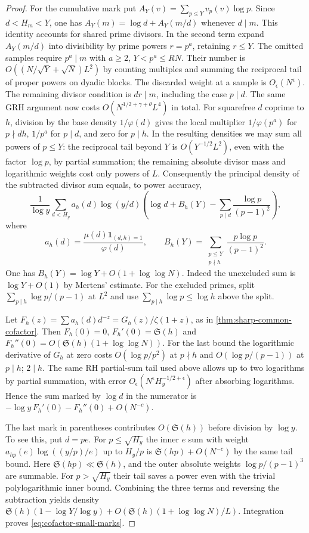 \documentclass[11pt,a4paper]{article}
\numberwithin{equation}{section}
\newcommand{\SSS}{\mathfrak S}
\begin{document}
\begin{proof}
For the cumulative mark put $A_Y(v)=\sum_{p\le Y}v_p(v)\log p$.
Since $d<H_m<Y$, one has $A_Y(m)=\log d+A_Y(m/d)$ whenever
$d\mid m$. This identity accounts for shared prime divisors.
In the second term expand $A_Y(m/d)$ into divisibility by prime
powers $r=p^a$, retaining $r\le Y$. The omitted samples require
$p^a\mid m$ with $a\ge2$, $Y<p^a\le RN$. Their number is
$O((N/\sqrt Y+\sqrt N)L^2)$ by counting multiples and summing
the reciprocal tail of proper powers on dyadic blocks. The
discarded weight at a sample is $O_\epsilon(N^\epsilon)$.
The remaining divisor condition is $dr\mid m$, including the
case $p\mid d$. The same GRH argument now costs
$O(N^{1/2+\gamma+\theta}L^4)$ in total. For squarefree $d$
coprime to $h$, division by the base density $1/\varphi(d)$
gives the local multiplier $1/\varphi(p^a)$ for $p\nmid dh$,
$1/p^a$ for $p\mid d$, and zero for $p\mid h$.
In the resulting densities we may sum all powers of $p\le Y$:
the reciprocal tail beyond $Y$ is $O(Y^{-1/2}L^2)$, even with
the factor $\log p$, by partial summation; the remaining absolute
divisor mass and logarithmic weights cost only powers of $L$.
Consequently the principal density of the subtracted divisor
sum equals, to power accuracy,
\[
 \frac1{\log y}\sum_{d<H_y}a_h(d)\log(y/d)
 \left(\log d+B_h(Y)-\sum_{p\mid d}\frac{\log p}{(p-1)^2}\right),
\]
where
\[
 a_h(d)=\frac{\mu(d)\mathbf1_{(d,h)=1}}{\varphi(d)},\qquad
 B_h(Y)=\sum_{\substack{p\le Y\\p\nmid h}}\frac{p\log p}{(p-1)^2}.
\]
One has $B_h(Y)=\log Y+O(1+\log\log N)$. Indeed the unexcluded
sum is $\log Y+O(1)$ by Mertens' estimate. For the excluded
primes, split $\sum_{p\mid h}\log p/(p-1)$ at $L^2$ and use
$\sum_{p\mid h}\log p\le\log h$ above the split.

Let $F_h(z)=\sum a_h(d)d^{-z}=G_h(z)/\zeta(1+z)$, as in
\cref{thm:sharp-common-cofactor}. Then $F_h(0)=0$,
$F_h'(0)=\SSS(h)$ and
$F_h''(0)=O(\SSS(h)(1+\log\log N))$. For the last bound the
logarithmic derivative of $G_h$ at zero costs
$O(\log p/p^2)$ at $p\nmid h$ and $O(\log p/(p-1))$ at
$p\mid h$; $2\mid h$. The same RH partial-sum tail used above
allows up to two logarithms by partial summation, with error
$O_\epsilon(N^\epsilon H_y^{-1/2+\epsilon})$ after absorbing
logarithms. Hence the sum marked by $\log d$ in the numerator
is $-\log y\,F_h'(0)-F_h''(0)+O(N^{-c})$.

The last mark in parentheses contributes $O(\SSS(h))$ before
division by $\log y$. To see this, put $d=pe$. For
$p\le\sqrt{H_y}$ the inner $e$ sum with weight
$a_{hp}(e)\log((y/p)/e)$ up to $H_y/p$ is
$\SSS(hp)+O(N^{-c})$ by the same tail bound.
Here $\SSS(hp)\ll\SSS(h)$, and the outer absolute weights
$\log p/(p-1)^3$ are summable. For $p>\sqrt{H_y}$ their tail
saves a power even with the trivial polylogarithmic inner bound.
Combining the three terms and reversing the subtraction yields
density $\SSS(h)(1-\log Y/\log y)
+O(\SSS(h)(1+\log\log N)/L)$. Integration proves
\eqref{eq:cofactor-small-marks}.
\end{proof}
\end{document}
